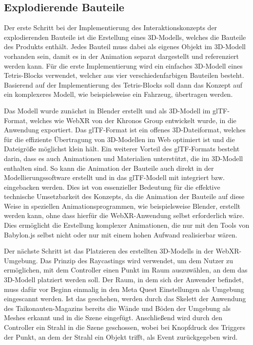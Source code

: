\subsection{Explodierende Bauteile}

Der erste Schritt bei der Implementierung des Interaktionskonzepts der \glqq{}explodierenden\grqq{} Bauteile ist die Erstellung eines 3D-Modells, welches die Bauteile des Produkts enthält.
Jedes Bauteil muss dabei als eigenes Objekt im 3D-Modell vorhanden sein, damit es in der Animation separat dargestellt und referenziert werden kann.
Für die erste Implementierung wird ein einfaches 3D-Modell eines Tetris-Blocks verwendet, welcher aus vier verschiedenfarbigen Bauteilen besteht.
Basierend auf der Implementierung des Tetris-Blocks soll dann das Konzept auf ein komplexeres Modell, wie beispielsweise ein Fahrzeug, übertragen werden.

Das Modell wurde zunächst in Blender erstellt und als 3D-Modell im glTF-Format, welches wie WebXR von der Khronos Group entwickelt wurde, in die Anwendung exportiert.
Das glTF-Format ist ein offenes 3D-Dateiformat, welches für die effiziente Übertragung von 3D-Modellen im Web optimiert ist und die Dateigröße möglichst klein hält.
Ein weiterer Vorteil des glTF-Formats besteht darin, dass es auch Animationen und Materialien unterstützt, die im 3D-Modell enthalten sind.
So kann die Animation der Bauteile auch direkt in der Modellierungssoftware erstellt und in das glTF-Modell mit integriert bzw. eingebacken werden.
Dies ist von essenzieller Bedeutung für die effektive technische Umsetzbarkeit des Konzepts, da die Animation der Bauteile auf diese Weise in speziellen Animationsprogrammen, wie beispielsweise Blender, erstellt werden kann, ohne dass hierfür die WebXR-Anwendung selbst erforderlich wäre.
Dies ermöglicht die Erstellung komplexer Animationen, die nur mit den Tools von Babylon.js selbst nicht oder nur mit einem hohen Aufwand realisierbar wären.

Der nächste Schritt ist das Platzieren des erstellten 3D-Modells in der WebXR-Umgebung.
Das Prinzip des Raycastings wird verwendet, um dem Nutzer zu ermöglichen, mit dem Controller einen Punkt im Raum auszuwählen, an dem das 3D-Modell platziert werden soll.
Der Raum, in dem sich der Anwender befindet, muss dafür vor Beginn einmalig in den Meta Quest Einstellungen als Umgebung eingescannt werden.
Ist das geschehen, werden durch das Skelett der Anwendung des Taikonauten-Magazins bereits die Wände und Böden der Umgebung als Meshes erkannt und in die Szene eingefügt.
Anschließend wird durch den Controller ein Strahl in die Szene geschossen, wobei bei Knopfdruck des Triggers der Punkt, an dem der Strahl ein Objekt trifft, als Event zurückgegeben wird.

